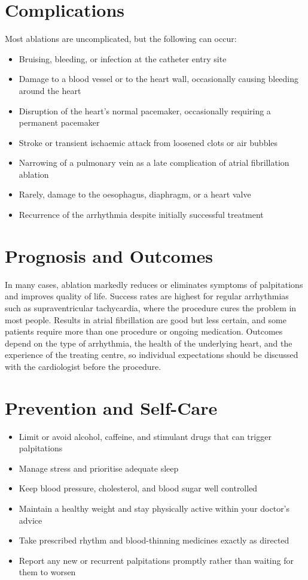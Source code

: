 \section*{Complications}
Most ablations are uncomplicated, but the following can occur:
\begin{itemize}
    \item Bruising, bleeding, or infection at the catheter entry site
    \item Damage to a blood vessel or to the heart wall, occasionally causing bleeding around the heart
    \item Disruption of the heart's normal pacemaker, occasionally requiring a permanent pacemaker
    \item Stroke or transient ischaemic attack from loosened clots or air bubbles
    \item Narrowing of a pulmonary vein as a late complication of atrial fibrillation ablation
    \item Rarely, damage to the oesophagus, diaphragm, or a heart valve
    \item Recurrence of the arrhythmia despite initially successful treatment
\end{itemize}

\section*{Prognosis and Outcomes}
In many cases, ablation markedly reduces or eliminates symptoms of palpitations and improves quality of life. Success rates are highest for regular arrhythmias such as supraventricular tachycardia, where the procedure cures the problem in most people. Results in atrial fibrillation are good but less certain, and some patients require more than one procedure or ongoing medication. Outcomes depend on the type of arrhythmia, the health of the underlying heart, and the experience of the treating centre, so individual expectations should be discussed with the cardiologist before the procedure.

\section*{Prevention and Self-Care}
\begin{itemize}
    \item Limit or avoid alcohol, caffeine, and stimulant drugs that can trigger palpitations
    \item Manage stress and prioritise adequate sleep
    \item Keep blood pressure, cholesterol, and blood sugar well controlled
    \item Maintain a healthy weight and stay physically active within your doctor's advice
    \item Take prescribed rhythm and blood-thinning medicines exactly as directed
    \item Report any new or recurrent palpitations promptly rather than waiting for them to worsen
\end{itemize}

